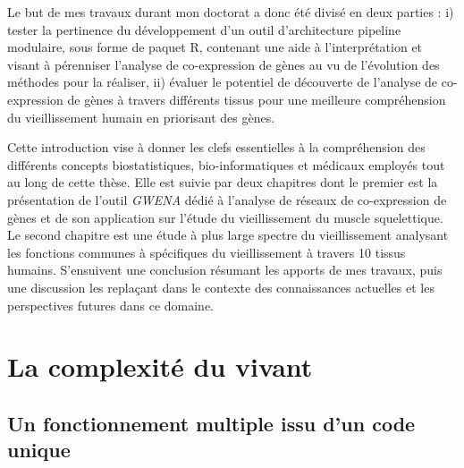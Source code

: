 Le but de mes travaux durant mon doctorat a donc été divisé en deux parties : i) tester la pertinence du développement d'un outil d'architecture pipeline modulaire, sous forme de paquet R, contenant une aide à l'interprétation et visant à pérenniser l'analyse de co-expression de gènes au vu de l'évolution des méthodes pour la réaliser, ii) évaluer le potentiel de découverte de l'analyse de co-expression de gènes à travers différents tissus pour une meilleure compréhension du vieillissement humain en priorisant des gènes. 

Cette introduction vise à donner les clefs essentielles à la compréhension des différents concepts biostatistiques, bio-informatiques et médicaux employés tout au long de cette thèse. Elle est suivie par deux chapitres dont le premier est la présentation de l'outil \textit{GWENA} dédié à l'analyse de réseaux de co-expression de gènes et de son application sur l'étude du vieillissement du muscle squelettique. Le second chapitre est une étude à plus large spectre du vieillissement analysant les fonctions communes à spécifiques du vieillissement à travers 10 tissus humains. S’ensuivent une conclusion résumant les apports de mes travaux, puis une discussion les replaçant dans le contexte des connaissances actuelles et les perspectives futures dans ce domaine.




\section{La complexité du vivant}

\subsection{Un fonctionnement multiple issu d'un code unique}

